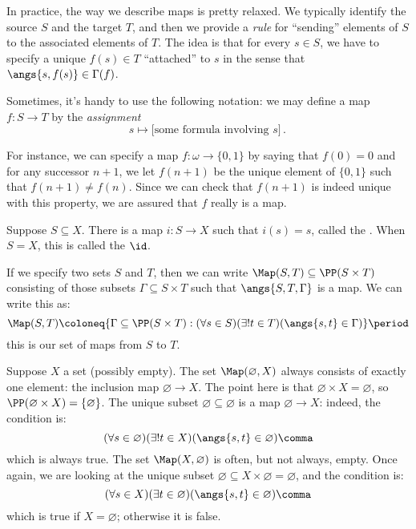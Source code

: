 In practice, the way we describe maps is pretty relaxed.
We typically identify the source $S$ and the target $T$, and
then we provide a \emph{rule} for \enquote{sending} elements of $S$ to the associated elements of $T$.
The idea is that for every $ s \in S$, we have to specify a unique $f(s) \in T$ \enquote{attached} to $s$ in the sense that $\angs{s, f(s)} \in \Gamma(f)$.

Sometimes, it's handy to use the following notation:
we may define a map $ f \colon S \to T $ by the \emph{assignment}
\[
	s \mapsto \text{[some formula involving $s$]} \period
\]

\begin{exm}
	For instance, we can specify a map $f\colon \omega \to \{0,1\}$ by saying that $f(0)=0$ and for any successor $n+1$, we let $f(n+1)$ be the unique element of $\{0,1\}$ such that $f(n+1)\neq f(n)$.
	Since we can check that $f(n+1)$ is indeed unique with this property, we are assured that $f$ really is a map.
\end{exm}

\begin{exm}
	Suppose $S\subseteq X$.
	There is a map $i\colon S \to X$ such that $i(s)=s$, called the .
	When $S=X$, this is called the  $\id$.
\end{exm}

If we specify two sets $S$ and $T$, then we can write $\Map(S, T) \subseteq \PP(S \times T)$ consisting of those subsets $\Gamma \subseteq S \times T $ such that $\angs{S, T, \Gamma}$ is a map.
We can write this as:
\[
	\Map(S, T) \coloneq \{ \Gamma \subseteq \PP(S \times T) : (\forall s \in S)(\exists ! t \in T)(\angs{s,t} \in \Gamma) \} \period
\]
this is our set of maps from $S$ to $T$.

\begin{exr}
	Suppose $X$ a set (possibly empty).
	The set $\Map(\varnothing,X)$ always consists of exactly one element: the inclusion map $\varnothing \to X$.
	The point here is that $\varnothing \times X = \varnothing $, so $\PP(\varnothing \times X) = \{\varnothing\}$.
	The unique subset $\varnothing \subseteq \varnothing $ is a map $\varnothing \to X$:
	indeed, the condition is:
	\[
		(\forall s \in \varnothing)(\exists ! t \in X)(\angs{s,t} \in \varnothing) \comma
	\]
	which is always true.
	The set $\Map(X,\varnothing)$ is often, but not always, empty.
	Once again, we are looking at the unique subset $ \varnothing \subseteq X \times \varnothing = \varnothing $, and the condition is:
	\[
		(\forall s \in X)(\exists t \in \varnothing)(\angs{s,t} \in \varnothing) \comma
	\]
	which is true if $X = \varnothing$;
	otherwise it is false. 
\end{exr}

